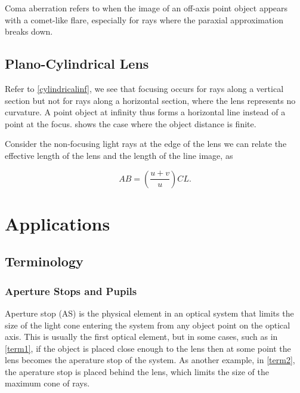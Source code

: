 \documentclass[english,a4paper,12pt]{report}
\begin{document}
Coma aberration refers to when the image of an off-axis point object appears with a comet-like flare, especially for rays where the paraxial approximation breaks down.









\subsection{Plano-Cylindrical Lens}

Refer to \cref{cylindricalinf}, we see that focusing occurs for rays along a vertical section but not for rays along a horizontal section, where the lens represents no curvature. A point object at infinity thus forms a horizontal line instead of a point at the focus.  shows the case where the object distance is finite.

Consider the non-focusing light rays at the edge of the lens we can relate the effective length of the lens and the length of the line image, as

\begin{equation}
    AB = \left( \frac{u+v}{u}  \right) CL.
\end{equation}




\section{Applications}

\subsection{Terminology}

\subsubsection{Aperture Stops and Pupils}

Aperture stop (AS) is the physical element in an optical system that limits the size of the light cone entering the system from any object point on the optical axis. This is usually the first optical element, but in some cases, such as in \cref{term1}, if the object is placed close enough to the lens then at some point the lens becomes the aperature stop of the system. As another example, in \cref{term2}, the aperature stop is placed behind the lens, which limits the size of the maximum cone of rays. 
\end{document}
